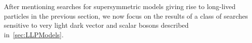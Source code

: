 After mentioning searches for supersymmetric models giving rise to long-lived particles in the previous section, we now focus on the results of a class of searches sensitive to very light dark vector and scalar bosons described in~\ref{sec:LLPModels}.%



